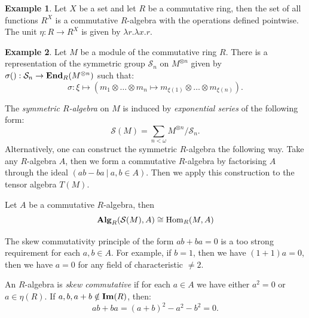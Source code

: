 \documentclass[8pt]{article}
\theoremstyle{definition}
\theoremstyle{definition}
\theoremstyle{definition}
\theoremstyle{definition}
\theoremstyle{definition}
\theoremstyle{definition}
\theoremstyle{definition}
\theoremstyle{definition}
\theoremstyle{definition}
\theoremstyle{definition}
\theoremstyle{definition}
\theoremstyle{definition}
\newtheorem{example}{Example}[section]
\theoremstyle{definition}
\theoremstyle{definition}
\theoremstyle{question}
\begin{document}
\begin{example}
  Let $X$ be a set and let $R$ be a commutative ring, then the set of all functions $R^X$ 
  is a commutative $R$-algebra with the operations defined pointwise. The unit $\eta : R \to R^X$
  is given by $\lambda r. \lambda x. r$.
\end{example}

\begin{example}
  Let $M$ be a module of the commutative ring $R$. There is a representation of the symmetric group
  $\mathcal{S}_n$ on $M^{\otimes n}$ given by $\sigma() : \mathcal{S}_n \to {\bf End}_R (M^{\otimes n})$ such that:
  \[
  \sigma : \xi \mapsto (m_1 \otimes \ldots \otimes m_n \mapsto m_{\xi(1)} \otimes \ldots \otimes m_{\xi(n)}).
  \]

  The \emph{symmetric $R$-algebra} on $M$ is induced by \emph{exponential series} of the following form:
  \[
  \mathcal{S}(M) = \sum \limits_{n < \omega} M^{\otimes n}/\mathcal{S}_n.
  \]
  Alternatively, one can construct the symmetric $R$-algebra the following way. Take any $R$-algebra $A$,
  then we form a commutative $R$-algebra by factorising $A$ through the ideal 
  $(a b - b a \: | \: a, b \in A)$. Then we apply this construction to the tensor algebra $T(M)$.

  Let $A$ be a commutative $R$-algebra, then
  \[
  {\bf Alg}_R(\mathcal{S}(M), A) \cong \operatorname{Hom}_R(M, A)
  \]
\end{example}

The skew commutativity principle of the form $a b + b a = 0$ is a too strong requirement for each $a, b \in A$.
For example, if $b = 1$, then we have $(1 + 1) a = 0$, then we have $a = 0$ for any field of characteristic $\neq 2$.

An $R$-algebra is \emph{skew commutative} if for each $a \in A$ we have either $a^2 = 0$ or $a \in \eta(R)$.
If $a, b, a + b \notin {\bf Im}(R)$, then:
\[
a b + b a = (a + b)^2 - a^2 - b^2 = 0.
\]
\end{document}
